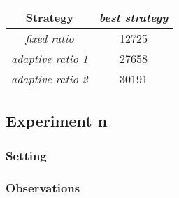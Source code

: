 \documentclass[11pt]{article}
\begin{document}
\begin{center}
\begin{tabular}{|c|c|}
\hline
Strategy & \textit{best strategy} \\
\hline
\textit{fixed ratio} & 12725 \\
\hline
\textit{adaptive ratio 1} & 27658 \\
\hline
\textit{adaptive ratio 2} & 30191 \\
\hline
\end{tabular}
\end{center}

\subsection{Experiment n}

\subsubsection{Setting}

\subsubsection{Observations}
\end{document}
